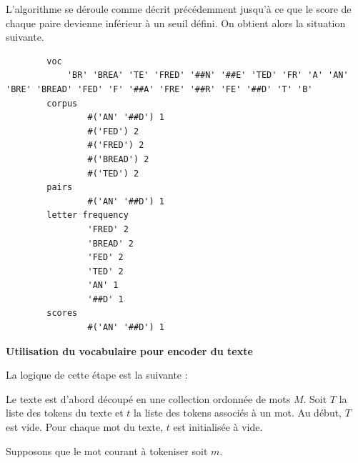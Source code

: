 \documentclass[12pt,a4paper]{report}
\begin{document}
	L’algorithme se déroule comme décrit précédemment jusqu’à ce que le score de chaque paire devienne inférieur à un seuil défini. On obtient alors la situation suivante.

	\begin{verbatim}
		voc   	
			'BR' 'BREA' 'TE' 'FRED' '##N' '##E' 'TED' 'FR' 'A' 'AN' 'BRE' 'BREAD' 'FED' 'F' '##A' 'FRE' '##R' 'FE' '##D' 'T' 'B' 
		corpus   	
				#('AN' '##D') 1 	
				#('FED') 2 	
				#('FRED') 2 	
				#('BREAD') 2 	
				#('TED') 2 
		pairs   	
				#('AN' '##D') 1 		
		letter frequency  	
				'FRED' 2 	
				'BREAD' 2 	
				'FED' 2 	
				'TED' 2 	
				'AN' 1 	
				'##D' 1 
		scores  	
				#('AN' '##D') 1 
	\end{verbatim}
	
	\textbf{Utilisation du vocabulaire pour encoder du texte}
	
	La logique de cette étape est la suivante :
	
	Le texte est d’abord découpé en une collection ordonnée de mots $M$.
	Soit $T$ la liste des tokens du texte et $t$ la liste des tokens associés à un mot. Au début, $T$ est vide. Pour chaque mot du texte, $t$ est initialisée à vide.
	
	Supposons que le mot courant à tokeniser soit $m$.
	
\end{document}
